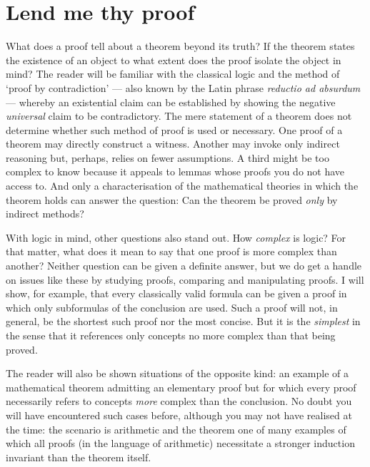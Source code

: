 %
\chapter{Lend me thy proof}
%

What does a proof tell about a theorem beyond its truth?
If the theorem states the existence of an object to what extent does the proof isolate the object in mind?
The reader will be familiar with the classical logic and the method of ‘proof by contradiction’ --- also known by the Latin phrase \emph{reductio ad absurdum} --- whereby an existential claim can be established by showing the negative \emph{universal} claim to be contradictory.
The mere statement of a theorem does not determine whether such method of proof is used or necessary.
One proof of a theorem may directly construct a witness.
Another may invoke only indirect reasoning but, perhaps, relies on fewer assumptions.
A third might be too complex to know because it appeals to lemmas whose proofs you do not have access to.
And only a characterisation of the mathematical theories in which the theorem holds can answer the question: Can the theorem be proved \emph{only} by indirect methods?

With logic in mind, other questions also stand out.
How \emph{complex} is logic? 
For that matter, what does it mean to say that one proof is more complex than another?
Neither question can be given a definite answer, but we do get a handle on issues like these by studying proofs, comparing and manipulating proofs.
I will show, for example, that every classically valid formula can be given a proof in which only subformulas of the conclusion are used.
Such a proof will not, in general, be the shortest such proof nor the most concise.
But it is the \emph{simplest} in the sense that it references only concepts no more complex than that being proved.

The reader will also be shown situations of the opposite kind: an example of a mathematical theorem admitting an elementary proof but for which every proof necessarily refers to concepts \emph{more} complex than the conclusion.
No doubt you will have encountered such cases before, although you may not have realised at the time: the scenario is arithmetic and the theorem one of many examples of which all proofs (in the language of arithmetic) necessitate a stronger induction invariant than the theorem itself.


